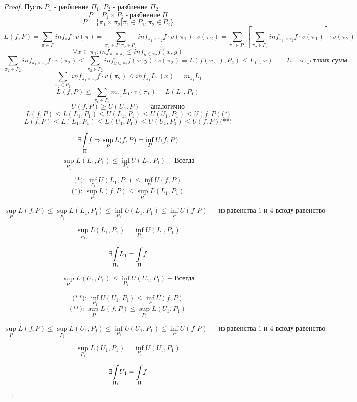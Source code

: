     \begin{proof}
        \par Пусть $P_1$ - разбиение $\Pi_1$, $P_2$ - разбиение $\Pi_2$
        $$P = P_1 \times P_2 \ \text{- разбиение } \Pi$$ 
        $$P = \{\pi_1 \times \pi_2 | \pi_1 \in P_1, \pi_2 \in P_2\}$$
        $$L(f, P) = \sum\limits_{\pi \in P} inf_{\pi} f \cdot v(\pi) = \sum\limits_{\pi_1 \in P_1 \pi_2 \in P_2} inf_{\pi_1 \times \pi_2} f \cdot v(\pi_1) \cdot v(\pi_2) = \sum\limits_{\pi_1 \in P_1} \left[ \sum\limits_{\pi_2 \in P_2} inf_{\pi_1 \times \pi_2} f \cdot v(\pi_1) \right] \cdot v(\pi_2)$$
        $$\forall x\in \pi_1: inf_{\pi_1 \times \pi_2} \le inf_{y \in \pi_2} f(x, y)$$
        $$\sum\limits_{\pi_2 \in P_2} inf_{\pi_1 \times \pi_2} f \cdot v(\pi_2) \le \sum\limits_{\pi_2 \in P_2} inf_{y \in \pi_2} f(x,y) \cdot v(\pi_2) = L(f(x, \cdot), P_2) \le L_1 (x) - \text{ $L_1$ - sup таких сумм} $$
        $$\sum\limits_{\pi_2 \in P_2} inf_{\pi_1 \times \pi_2} f \cdot v(\pi_2) \le inf_{\pi_1} L_1(x) = m_{\pi_1} L_1$$
        $$L(f, P) \le \sum\limits_{\pi_1 \in P_1} m_{\pi_1} L_1 \cdot v(\pi_1) = L(L_1, P_1)$$
        $$U(f, P) \ge U(U_1, P) - \text{ аналогично}$$
        $$L(f, P) \le L(L_1, P_1) \le U(L_1, P_1) \le U(U_1, P_1) \le U(f, P) \text{(*)} $$
        $$L(f, P) \le L(L_1, P_1) \le L(U_1, P_1) \le U(U_1, P_1) \le U(f, P) \text{(**)}$$

        $$\exists \underset{\Pi}{\int} f \Rightarrow \sup_{P} L(f, P) = \inf_{P} U(f, P)$$
        $$\sup_{P_1} L(L_1, P_1) \le \inf_{P_1} U(L_1, P_1) - \text{Всегда}$$
        
        $$\text{(*): } \inf_{P_1} U(L_1, P_1) \le \inf_{P} U(f, P)$$
        $$\text{(*): } \sup_{P} L(f, P) \le \sup_{P_1} L(L_1, P_1)$$

        $$\sup_{P} L(f, P) \le \sup_{P_1} L(L_1, P_1) \le \inf_{P_1} U(L_1, P_1) \le \inf_{P} U(f, P) - \text{ из равенства 1 и 4 всюду равенство}$$

        $$\sup_{P_1} L(L_1, P_1) = \inf_{P_1} U(L_1, P_1)$$

        $$\exists \underset{\Pi_1}{\int} L_1 = \underset{\Pi}{\int} f$$

        $$\sup_{P_1} L(U_1, P_1) \le \inf_{P_1} U(U_1, P_1) - \text{Всегда}$$
        
        $$\text{(**): } \inf_{P_1} U(U_1, P_1) \le \inf_{P} U(f, P)$$
        $$\text{(**): } \sup_{P} L(f, P) \le \sup_{P_1} L(U_1, P_1)$$

        $$\sup_{P} L(f, P) \le \sup_{P_1} L(U_1, P_1) \le \inf_{P_1} U(U_1, P_1) \le \inf_{P} U(f, P) - \text{ из равенства 1 и 4 всюду равенство}$$

        $$\sup_{P_1} L(U_1, P_1) = \inf_{P_1} U(U_1, P_1)$$

        $$\exists \underset{\Pi_1}{\int} U_1 = \underset{\Pi}{\int} f$$



    \end{proof}

